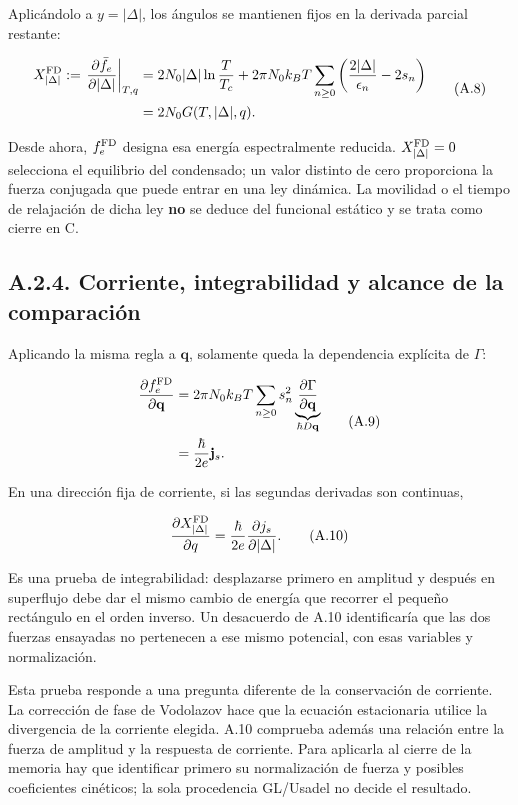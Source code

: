\documentclass[
  spanish,
  10pt,
  a4paper,
]{article}
\begin{document}
Aplicándolo a \(y=|\Delta|\), los ángulos se mantienen fijos en la
derivada parcial restante:

\[
\begin{aligned}
X_{|\Delta|}^{\rm FD}
:=\left.\frac{\partial\bar f_e}{\partial|\Delta|}\right|_{T,q}
&=2N_0|\Delta|\ln\frac{T}{T_c}
+2\pi N_0k_BT\sum_{n\geq0}
\left(\frac{2|\Delta|}{\epsilon_n}-2s_n\right)\\
&=2N_0G(T,|\Delta|,q).
\end{aligned}
\tag{A.8}
\]

Desde ahora, \(f_e^{\rm FD}\) designa esa energía espectralmente
reducida. \(X_{|\Delta|}^{\rm FD}=0\) selecciona el equilibrio del
condensado; un valor distinto de cero proporciona la fuerza conjugada
que puede entrar en una ley dinámica. La movilidad o el tiempo de
relajación de dicha ley \textbf{no} se deduce del funcional estático y
se trata como cierre en C.

\subsection{A.2.4. Corriente, integrabilidad y alcance de la
comparación}\label{a.2.4.-corriente-integrabilidad-y-alcance-de-la-comparaciuxf3n}

Aplicando la misma regla a \(\mathbf q\), solamente queda la dependencia
explícita de \(\Gamma\):

\[
\begin{aligned}
\frac{\partial f_e^{\rm FD}}{\partial\mathbf q}
&=2\pi N_0k_BT\sum_{n\geq0}s_n^2
\underbrace{\frac{\partial\Gamma}{\partial\mathbf q}}_{\hbar D\mathbf q}\\
&=\frac{\hbar}{2e}\mathbf j_s.
\end{aligned}
\tag{A.9}
\]

En una dirección fija de corriente, si las segundas derivadas son
continuas,

\[
\frac{\partial X_{|\Delta|}^{\rm FD}}{\partial q}
=\frac{\hbar}{2e}\frac{\partial j_s}{\partial|\Delta|}.
\tag{A.10}
\]

Es una prueba de integrabilidad: desplazarse primero en amplitud y
después en superflujo debe dar el mismo cambio de energía que recorrer
el pequeño rectángulo en el orden inverso. Un desacuerdo de A.10
identificaría que las dos fuerzas ensayadas no pertenecen a ese mismo
potencial, con esas variables y normalización.

Esta prueba responde a una pregunta diferente de la conservación de
corriente. La corrección de fase de Vodolazov hace que la ecuación
estacionaria utilice la divergencia de la corriente elegida. A.10
comprueba además una relación entre la fuerza de amplitud y la respuesta
de corriente. Para aplicarla al cierre de la memoria hay que identificar
primero su normalización de fuerza y posibles coeficientes cinéticos; la
sola procedencia GL/Usadel no decide el resultado.
\end{document}
